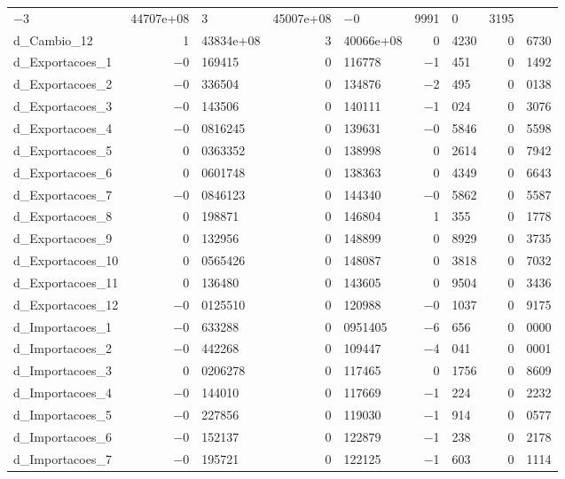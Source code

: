 \documentclass[11pt]{article}
\begin{document}
\begin{center}
\begin{tabular}{lr@{,}lr@{,}lr@{,}lr@{,}l}
  $-$3&44707\textrm{e+08} &
    3&45007\textrm{e+08} &
      $-$0&9991 &
        0&3195 \\
d\_Cambio\_12 &
  1&43834\textrm{e+08} &
    3&40066\textrm{e+08} &
      0&4230 &
        0&6730 \\
d\_Exportacoes\_1 &
  $-$0&169415 &
    0&116778 &
      $-$1&451 &
        0&1492 \\
d\_Exportacoes\_2 &
  $-$0&336504 &
    0&134876 &
      $-$2&495 &
        0&0138 \\
d\_Exportacoes\_3 &
  $-$0&143506 &
    0&140111 &
      $-$1&024 &
        0&3076 \\
d\_Exportacoes\_4 &
  $-$0&0816245 &
    0&139631 &
      $-$0&5846 &
        0&5598 \\
d\_Exportacoes\_5 &
  0&0363352 &
    0&138998 &
      0&2614 &
        0&7942 \\
d\_Exportacoes\_6 &
  0&0601748 &
    0&138363 &
      0&4349 &
        0&6643 \\
d\_Exportacoes\_7 &
  $-$0&0846123 &
    0&144340 &
      $-$0&5862 &
        0&5587 \\
d\_Exportacoes\_8 &
  0&198871 &
    0&146804 &
      1&355 &
        0&1778 \\
d\_Exportacoes\_9 &
  0&132956 &
    0&148899 &
      0&8929 &
        0&3735 \\
d\_Exportacoes\_10 &
  0&0565426 &
    0&148087 &
      0&3818 &
        0&7032 \\
d\_Exportacoes\_11 &
  0&136480 &
    0&143605 &
      0&9504 &
        0&3436 \\
d\_Exportacoes\_12 &
  $-$0&0125510 &
    0&120988 &
      $-$0&1037 &
        0&9175 \\
d\_Importacoes\_1 &
  $-$0&633288 &
    0&0951405 &
      $-$6&656 &
        0&0000 \\
d\_Importacoes\_2 &
  $-$0&442268 &
    0&109447 &
      $-$4&041 &
        0&0001 \\
d\_Importacoes\_3 &
  0&0206278 &
    0&117465 &
      0&1756 &
        0&8609 \\
d\_Importacoes\_4 &
  $-$0&144010 &
    0&117669 &
      $-$1&224 &
        0&2232 \\
d\_Importacoes\_5 &
  $-$0&227856 &
    0&119030 &
      $-$1&914 &
        0&0577 \\
d\_Importacoes\_6 &
  $-$0&152137 &
    0&122879 &
      $-$1&238 &
        0&2178 \\
d\_Importacoes\_7 &
  $-$0&195721 &
    0&122125 &
      $-$1&603 &
        0&1114 \\

\end{tabular}
\end{center}
\end{document}
